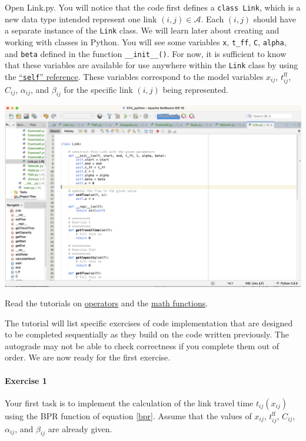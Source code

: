 \documentclass[11pt]{article}
\newcommand{\A}{\mathcal{A}}
\newcommand{\tff}{t^{\mathrm{ff}}_{ij}}
\begin{document}
Open Link.py. You will notice that the code first defines a \texttt{class Link}, which is a new data type intended represent one link $(i,j)\in\A$. Each $(i,j)$ should have a separate instance of the \texttt{Link} class. 
We will learn later about creating and working with classes in Python. You will see some variables \texttt{x}, \texttt{t\_ff}, \texttt{C}, \texttt{alpha}, and \texttt{beta} defined in the function \texttt{\_\_init\_\_()}. For now, it is sufficient to know that these variables are available for use anywhere within the \texttt{Link} class by using the \href{https://www.w3schools.com/python/gloss_python_self.asp}{``\texttt{self}'' reference}. These variables correspond to the model variables $x_{ij}$, $t^{\mathrm{ff}}_{ij}$, $C_{ij}$, $\alpha_{ij}$, and $\beta_{ij}$ for the specific link $(i,j)$ being represented. 

\begin{center}
\includegraphics[width=\textwidth]{netbeans2.png}
\end{center}


\noindent Read the  tutorials on \href{https://www.w3schools.com/python/python_operators.asp}{operators} and the \href{https://www.w3schools.com/python/python_math.asp}{math functions}. 
	
	
	The tutorial will list specific exercises of code implementation that are designed to be completed sequentially as they build on the code written previously. The autograde may not be able to check correctness if you complete them out of order. We are now ready for the first exercise.
	
\paragraph*{Exercise 1} Your first task is to implement the calculation of the link travel time $t_{ij}(x_{ij})$ using the BPR function of equation \eqref{bpr}. Assume that the values of $x_{ij}$, $\tff$, $C_{ij}$, $\alpha_{ij}$, and $\beta_{ij}$ are already given. 
\end{document}
